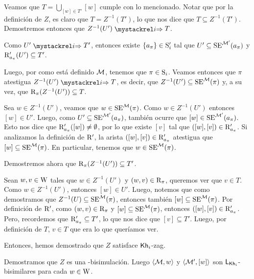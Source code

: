 \begin{demostracion}
\begin{itemize}
        Veamos que $T = \bigcup\limits_{[w] \in T'} [w]$ cumple con lo mencionado. Notar que por la definición de $Z$, es claro que 
        $T = Z^{-1}(T')$, lo que nos dice que $T \subseteq Z^{-1}(T')$. Demostremos entonces que $Z^{-1}(U') \ultsExecAgi T$. 
    
        Como $U' \ultsExecAgi T'$, entonces existe $\{a_\pi\} \in \S_i'$ tal que $U' \subseteq \sexec^{\model'}(a_\pi)$ 
        y $\R'_{a_\pi}(U') \subseteq T'$.

        Luego, por como está definido $\modults$, tenemos que $\pi \in \S_i$. 
        Veamos entonces que $\pi$ atestigua $Z^{-1}(U') \ultsExecAgi T$, es decir, que 
        $Z^{-1}(U') \subseteq \sexec^{\model}(\pi)$ y, a su vez, que $\R_\pi(Z^{-1}(U')) \subseteq T$.

        Sea $w \in Z^{-1}(U')$, veamos que $w \in \sexec^{\model}(\pi)$. Como $w \in Z^{-1}(U')$ entonces $[w] \in U'$. Luego, 
        como $U' \subseteq \sexec^{\model'}(a_\pi)$, también ocurre que $[w] \in \sexec^{\model'}(a_\pi)$. Esto nos dice que 
        $\R'_{a_\pi}([w]) \neq \emptyset$, por lo que existe $[v]$ tal que $([w],[v]) \in \R'_{a_\pi}$. Si analizamos la definición de 
        $\R'$, la arista $([w],[v]) \in \R'_{a_\pi}$ atestigua que $[w] \subseteq \sexec^{\model}(\pi)$. En particular, tenemos que 
        $w \in \sexec^{\model}(\pi)$.

        Demostremos ahora que $\R_{\pi}(Z^{-1}(U')) \subseteq T'$. 

        Sean $w, v \in \W$ tales que $w \in Z^{-1}(U')$ y $(w,v) \in \R_\pi$, queremos ver que $v \in T$. 
        Como $w \in Z^{-1}(U')$, entonces $[w] \in U'$. Luego, notemos que como demostramos que 
        $Z^{-1}(U) \subseteq \sexec^{\model}(\pi)$, entonces también $[w] \subseteq \sexec^{\model}(\pi)$. 
        Por definición de $\R'$, como $(w,v) \in \R_\pi$ y 
        $[w] \subseteq \sexec^{\model}(\pi)$, entonces $([w],[v]) \in \R'_{a_\pi}$. Pero, recordemos que 
        $\R'_{a_\pi} \subseteq T'$, lo que nos dice que $[v] \subseteq T'$. Luego, por definición de $T$, $v \in T$ que era lo que 
        queríamos ver.

        Entonces, hemos demostrado que $Z$ satisface $\khi$-zag.
    \end{itemize}
    Demostramos que $Z$ es una \KHilogic-bisimulación. Luego $\tup{\modults,w}$ y $\tup{\modults',[w]}$ son $\KHilogic$-bisimilares para cada $w \in \W$.
\end{demostracion}


